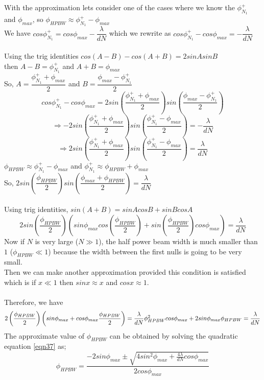 With the approximation lets consider one of the cases where we know the $\phi_{N_1}^{+}$ and $\phi_{max}$, so $\phi_{HPBW} \approx \phi_{N_1}^{+} - \phi_{max} $ \\ 
We have $cos\phi_{N_1}^{+} = cos\phi_{max} - \dfrac{\lambda}{dN}$ which we rewrite as $cos\phi_{N_1}^{+} - cos\phi_{max} = - \dfrac{\lambda}{dN}$ \\ \\
Using the trig identities $cos(A - B) -cos(A + B) = 2sinAsinB$ \\ 
then $A - B = \phi_{N_1}^{+}$ and  $A + B = \phi_{max}$ \\ 
So, $ A = \dfrac{\phi_{N_1}^{+} + \phi_{max}}{2}$ and $B =  \dfrac{\phi_{max} - \phi_{N_1}^{+}}{2} $
$$cos\phi_{N_1}^{+} - cos\phi_{max} = 2sin (\dfrac{\phi_{N_1}^{+} + \phi_{max}}{2}) sin(\dfrac{\phi_{max} - \phi_{N_1}^{+}}{2})$$
$$ \Rightarrow  -2sin (\dfrac{\phi_{N_1}^{+} + \phi_{max}}{2}) sin(\dfrac{\phi_{N_1}^{+} - \phi_{max}}{2}) = - \dfrac{\lambda}{dN}$$ 
$$ \Rightarrow  2sin (\dfrac{\phi_{N_1}^{+} + \phi_{max}}{2}) sin(\dfrac{\phi_{N_1}^{+} - \phi_{max}}{2}) =  \dfrac{\lambda}{dN}$$
$\phi_{HPBW} \approx \phi_{N_1}^{+} - \phi_{max} $ and $\phi_{N_1}^{+} \approx \phi_{HPBW} + \phi_{max}$ \\
So, $2sin(\dfrac{\phi_{HPBW}}{2})sin(\dfrac{\phi_{max} + \phi_{HPBW}}{2}) = \dfrac{\lambda}{dN}$ \\ \\
Using trig identities, $sin(A+B) = sinAcosB + sinBcosA $ 
$$ 2sin(\dfrac{\phi_{HPBW}}{2})(sin\phi_{max}cos(\dfrac{\phi_{HPBW}}{2}) + sin(\dfrac{\phi_{HPBW}}{2})cos\phi_{max}) = \dfrac{\lambda}{dN} $$
Now if $N$ is very large ($N \gg 1$), the half power beam width is much smaller than $1$ ($\phi_{HPBW} \ll 1$) because the width between the first nulls is going to be very small. \\
Then we can make another approximation provided this condition is satisfied which is if  $x\ll1$ then $sinx \approx x$ and $cos x \approx 1$. \\ \\
Therefore, we have 
\begin{equation}
2\left(\dfrac{\phi_{HPBW}}{2}\right)\left(sin\phi_{max} + cos\phi_{max}\dfrac{\phi_{HPBW}}{2}\right) = \dfrac{\lambda}{dN}$$ 
$$ \phi^2_{HPBW}cos\phi_{max} + 2sin\phi_{max}\phi_{HPBW} = \dfrac{\lambda}{dN}
\label{eqn37}
\end{equation}
The approximate value of $\phi_{HPBW}$ can be obtained by solving the quadratic equation \ref{eqn37} as;
$$ \phi_{HPBW} = \dfrac{-2sin\phi_{max}\pm\sqrt{4sin^2\phi_{max} + \frac{4\lambda}{dN}cos\phi_{max}}}{2cos\phi_{max}}$$
